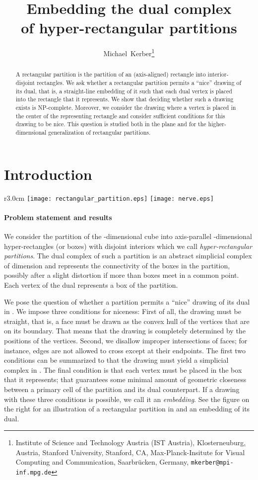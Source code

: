 \documentclass[12pt]{article}
\title{Embedding the dual complex\\
  of hyper-rectangular partitions
  }
\author{Michael~Kerber\thanks{Institute of Science and Technology Austria (IST Austria), Klosterneuburg, Austria, 
          Stanford University, Stanford, CA,
          Max-Planck-Insitute for Visual Computing and Communication, Saarbr\"ucken, Germany,  
          \texttt{mkerber@mpi-inf.mpg.de}}
}
\begin{document}
\maketitle


\begin{abstract}
A rectangular partition is the partition of an (axis-aligned) rectangle
into interior-disjoint rectangles. We ask whether a rectangular
partition permits a ``nice'' drawing of its dual, 
that is, a straight-line embedding of it 
such that each dual vertex is placed into the rectangle that it represents.
We show that deciding whether such a drawing exists is NP-complete. 
Moreover, we consider the drawing where a vertex is placed in the center
of the representing rectangle and consider sufficient conditions for this drawing
to be nice. This question is studied both in the plane 
and for the higher-dimensional generalization of rectangular partitions.
\end{abstract}

\section{Introduction}

\begin{wrapfigure}[13]{r}{3.0cm}
\vspace{-0.5cm}
\texttt{[image: rectangular\_partition.eps]}
\texttt{[image: nerve.eps]}
\end{wrapfigure}
\paragraph{Problem statement and results}
We consider the partition of the -dimensional cube into axis-parallel 
-dimensional hyper-rectangles (or boxes)
with disjoint interiors which we call \emph{hyper-rectangular partitions}. 
The dual complex of such a partition is an abstract simplicial complex of dimension 
and represents the connectivity of the boxes in the partition, possibly after a slight distortion
if more than  boxes meet in a common point. Each vertex of the dual represents
a box of the partition. 

We pose the question of whether a partition permits a ``nice'' drawing of its dual in . 
We impose three conditions for niceness: First of all, the drawing must be straight, that is,
a face must be drawn as the convex hull of the vertices that are on its boundary. That means that
the drawing is completely determined by the positions of the vertices. Second, we disallow
improper intersections of faces; for instance, edges are not allowed to cross except at their 
endpoints. The first two conditions can be summarized to that the drawing must yield a simplicial
complex in . The final condition is that each vertex must be placed in the box that it
represents; that guarantees some minimal amount of geometric closeness between
a primary cell of the partition and its dual counterpart.
If a drawing with these three conditions is possible, we call it an \emph{embedding}.
See the figure on the right for an illustration of a rectangular partition in  and an embedding of its dual.
\end{document}
